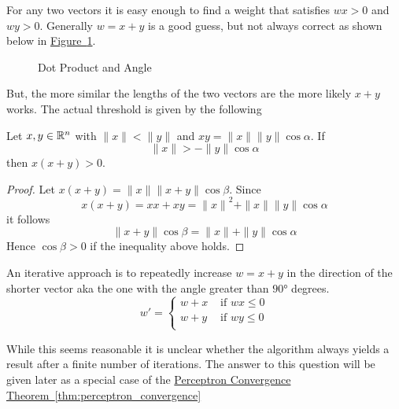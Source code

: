 For any two vectors it is easy enough to find a weight that satisfies \( wx > 0 \) and \( wy > 0 \).
Generally \( w = x + y \) is a good guess, but not always correct as shown below in
\hyperref[fig:vectorangle]{Figure~\ref*{fig:vectorangle}}.

\bigskip
\begin{figure}[H]
    \centering
    \plotvectorangle{}
    \caption{Dot Product and Angle}\label{fig:vectorangle}
\end{figure}
\bigskip

But, the more similar the lengths of the two vectors are the more likely \( x + y \) works.
The actual threshold is given by the following
\bigskip

\begin{lemma}
    Let \( x, y \in \mathbb{R}^n \) with \( \|x\| < \|y\| \) and \( xy = \|x\| \|y\| \cos\alpha \). If
    \[
        \|x\| > -\|y\|\cos\alpha
    \]
    then \( x(x + y) > 0 \).
\end{lemma}

\begin{proof}
    Let \( x(x + y) = \|x\| \|x + y\| \cos\beta \). Since
    \[
        x(x + y) = xx + xy = {\|x\|}^2 + \|x\| \|y\| \cos\alpha
    \]
    it follows
    \[
        {\|x + y\|}\cos\beta = \|x\| + \|y\|\cos\alpha
    \]
    Hence \( \cos\beta > 0 \) if the inequality above holds.
\end{proof}
\bigskip


An iterative approach is to repeatedly increase \( w = x + y \) in the direction of the shorter vector
aka the one with the angle greater than \( \ang{90} \) degrees.
\[
    w' = \left \{
    \begin{array}{ll}
        w + x & \text{ if } w x \le 0 \\
        w + y & \text{ if } w y \le 0 \\
    \end{array}
    \right.
\]

While this seems reasonable it is unclear whether the algorithm always yields a result after
a finite number of iterations. The answer to this question will be given later as a special case
of the \hyperref[thm:perceptron_convergence]{Perceptron Convergence Theorem~\ref*{thm:perceptron_convergence}}
\bigskip


\begin{algorithm}[Weight]\label{algo:weight}
\end{algorithm}
\inputminted[fontsize=\small, framesep=0.35cm, frame=lines, python3=true]{python}{python/weight.py}
\bigskip



